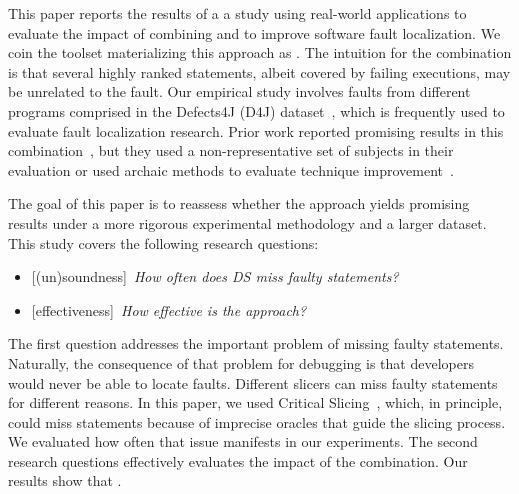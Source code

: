 \documentclass{article}
\begin{document}
This paper reports the results of a a study using real-world applications to
evaluate the impact of combining \ds{} and \sfl{} to improve software fault
localization. We coin the toolset materializing this approach as \comb{}.  The
intuition for the combination is that several highly ranked statements, albeit
covered by failing executions, may be unrelated to the fault. Our empirical
study involves \numFaults{} faults from \numPrograms{} different programs
comprised in the Defects4J (D4J) dataset~\cite{just-defects4j-issta2014}, which
is frequently used to evaluate fault localization research. Prior work reported
promising results in this
combination~\cite{Wotawa:2010:FLB:1848650.1849235,Alves:2011:FUD:2190078.2190115,DBLP:conf/ecai/HoferW12,lei-mao-dai-wang-2012,slicing-sfl-repair},
but they used a non-representative set of subjects in their evaluation or used
archaic methods to evaluate technique
improvement~\cite{Wu:2014:CLC:2610384.2610386,Lucia:2014:FFL:2642937.2642983,Wen:2016:LLB:2970276.2970359}.

The goal of this paper is to reassess whether the \comb{} approach
yields promising results under a more rigorous experimental
methodology and a larger dataset. This study covers the following research questions:

\newcommand{\rqone}{How often does DS miss faulty statements?}
\newcommand{\rqthree}{How effective is the \comb{} approach?}

\begin{itemize}[leftmargin=*]
\item[]{\footnotesize[(un)soundness]}~\textit{\rqone{}}
\item[]{\footnotesize[effectiveness]}~\textit{\rqthree{}}
\end{itemize}

The first question addresses the important problem of missing faulty
statements. Naturally, the consequence of that problem for debugging
is that developers would never be able to locate faults. Different
slicers can miss faulty statements for different reasons. In this
paper, we used Critical Slicing~\cite{DeMillo:1996:CSS:229000.226310},
which, in principle, could miss statements because of imprecise
oracles that guide the slicing process. We evaluated how often that
issue manifests in our experiments. The second research questions
effectively evaluates the impact of the combination. Our
results show that .
\end{document}
